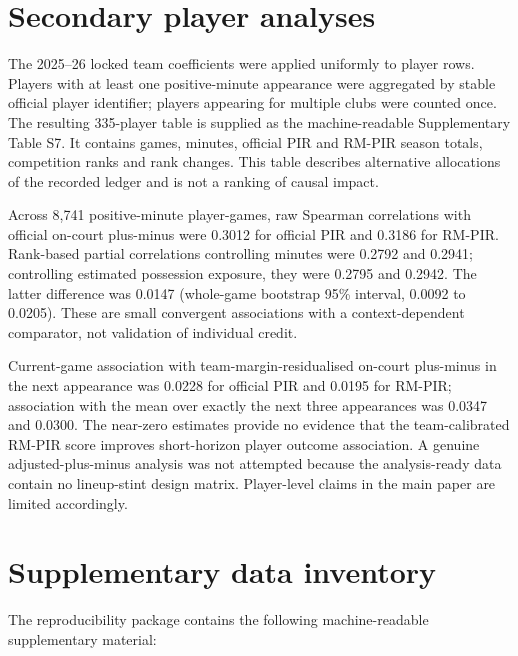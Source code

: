 \documentclass[pdflatex,sn-mathphys-num]{sn-jnl}
\begin{document}
\section{Secondary player analyses}

The 2025--26 locked team coefficients were applied uniformly to player rows. Players with at least one positive-minute appearance were aggregated by stable official player identifier; players appearing for multiple clubs were counted once. The resulting 335-player table is supplied as the machine-readable Supplementary Table S7. It contains games, minutes, official PIR and RM-PIR season totals, competition ranks and rank changes. This table describes alternative allocations of the recorded ledger and is not a ranking of causal impact.

Across 8,741 positive-minute player-games, raw Spearman correlations with official on-court plus-minus were 0.3012 for official PIR and 0.3186 for RM-PIR. Rank-based partial correlations controlling minutes were 0.2792 and 0.2941; controlling estimated possession exposure, they were 0.2795 and 0.2942. The latter difference was 0.0147 (whole-game bootstrap 95\% interval, 0.0092 to 0.0205). These are small convergent associations with a context-dependent comparator, not validation of individual credit.

Current-game association with team-margin-residualised on-court plus-minus in the next appearance was 0.0228 for official PIR and 0.0195 for RM-PIR; association with the mean over exactly the next three appearances was 0.0347 and 0.0300. The near-zero estimates provide no evidence that the team-calibrated RM-PIR score improves short-horizon player outcome association. A genuine adjusted-plus-minus analysis was not attempted because the analysis-ready data contain no lineup-stint design matrix. Player-level claims in the main paper are limited accordingly.

\section{Supplementary data inventory}

The reproducibility package contains the following machine-readable supplementary material:
\end{document}
